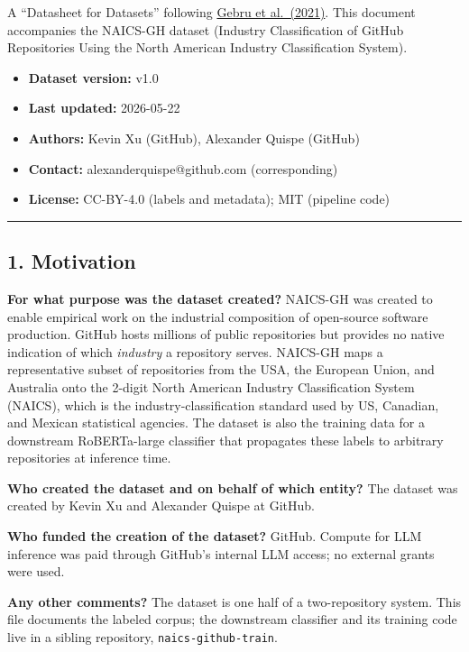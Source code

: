 A ``Datasheet for Datasets'' following \href{https://dl.acm.org/doi/10.1145/3458723}{Gebru et al.~(2021)}.
This document accompanies the NAICS-GH dataset (Industry Classification of
GitHub Repositories Using the North American Industry Classification
System).

\begin{itemize}
\tightlist
\item
  \textbf{Dataset version:} v1.0
\item
  \textbf{Last updated:} 2026-05-22
\item
  \textbf{Authors:} Kevin Xu (GitHub), Alexander Quispe (GitHub)
\item
  \textbf{Contact:} alexanderquispe@github.com (corresponding)
\item
  \textbf{License:} CC-BY-4.0 (labels and metadata); MIT (pipeline code)
\end{itemize}

\begin{center}\rule{0.5\linewidth}{0.5pt}\end{center}

\hypertarget{motivation}{%
\subsection{1. Motivation}\label{motivation}}

\textbf{For what purpose was the dataset created?}
NAICS-GH was created to enable empirical work on the industrial
composition of open-source software production. GitHub hosts millions
of public repositories but provides no native indication of which
\emph{industry} a repository serves. NAICS-GH maps a representative subset
of repositories from the USA, the European Union, and Australia onto
the 2-digit North American Industry Classification System (NAICS),
which is the industry-classification standard used by US, Canadian, and
Mexican statistical agencies. The dataset is also the training data for
a downstream RoBERTa-large classifier that propagates these labels to
arbitrary repositories at inference time.

\textbf{Who created the dataset and on behalf of which entity?}
The dataset was created by Kevin Xu and Alexander Quispe at GitHub.

\textbf{Who funded the creation of the dataset?}
GitHub. Compute for LLM inference was paid through GitHub's internal
LLM access; no external grants were used.

\textbf{Any other comments?}
The dataset is one half of a two-repository system. This file
documents the labeled corpus; the downstream classifier and its
training code live in a sibling repository, \texttt{naics-github-train}.

